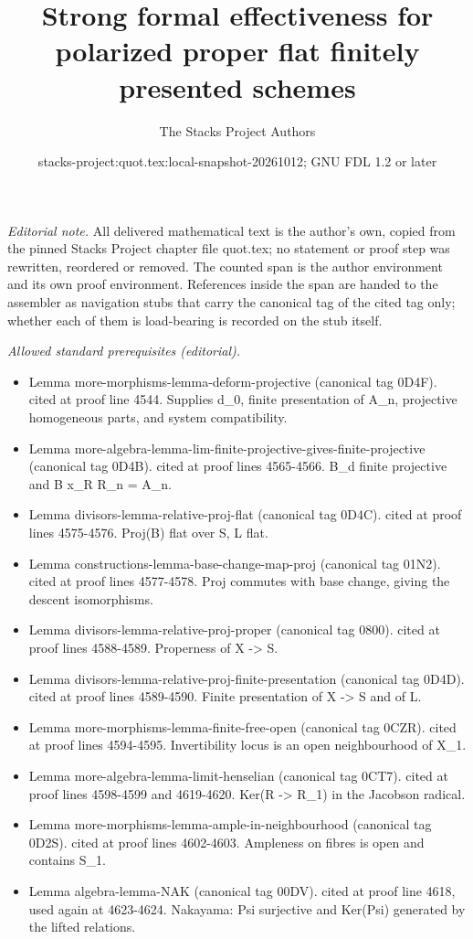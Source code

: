 \documentclass{stacks-project}
\title{Strong formal effectiveness for polarized proper flat finitely presented schemes}
\author{The Stacks Project Authors}
\date{stacks-project:quot.tex:local-snapshot-20261012; GNU FDL 1.2 or later}
\theoremstyle{plain}
\theoremstyle{definition}
\theoremstyle{remark}
\numberwithin{equation}{subsection}
\begin{document}
\maketitle
\setcounter{subsection}{1}
\noindent\textit{Editorial note.} All delivered mathematical text is the author's own, copied from the pinned Stacks Project chapter file quot.tex; no statement or proof step was rewritten, reordered or removed. The counted span is the author environment and its own proof environment. References inside the span are handed to the assembler as navigation stubs that carry the canonical tag of the cited tag only; whether each of them is load-bearing is recorded on the stub itself.\par\medskip
\noindent\textit{Allowed standard prerequisites (editorial).}\begin{itemize}
\item Lemma more-morphisms-lemma-deform-projective (canonical tag 0D4F). cited at proof line 4544. Supplies d\_0, finite presentation of A\_n, projective homogeneous parts, and system compatibility.
\item Lemma more-algebra-lemma-lim-finite-projective-gives-finite-projective (canonical tag 0D4B). cited at proof lines 4565-4566. B\_d finite projective and B x\_R R\_n = A\_n.
\item Lemma divisors-lemma-relative-proj-flat (canonical tag 0D4C). cited at proof lines 4575-4576. Proj(B) flat over S, L flat.
\item Lemma constructions-lemma-base-change-map-proj (canonical tag 01N2). cited at proof lines 4577-4578. Proj commutes with base change, giving the descent isomorphisms.
\item Lemma divisors-lemma-relative-proj-proper (canonical tag 0800). cited at proof lines 4588-4589. Properness of X -> S.
\item Lemma divisors-lemma-relative-proj-finite-presentation (canonical tag 0D4D). cited at proof lines 4589-4590. Finite presentation of X -> S and of L.
\item Lemma more-morphisms-lemma-finite-free-open (canonical tag 0CZR). cited at proof lines 4594-4595. Invertibility locus is an open neighbourhood of X\_1.
\item Lemma more-algebra-lemma-limit-henselian (canonical tag 0CT7). cited at proof lines 4598-4599 and 4619-4620. Ker(R -> R\_1) in the Jacobson radical.
\item Lemma more-morphisms-lemma-ample-in-neighbourhood (canonical tag 0D2S). cited at proof lines 4602-4603. Ampleness on fibres is open and contains S\_1.
\item Lemma algebra-lemma-NAK (canonical tag 00DV). cited at proof line 4618, used again at 4623-4624. Nakayama: Psi surjective and Ker(Psi) generated by the lifted relations.
\end{itemize}\medskip
\end{document}
